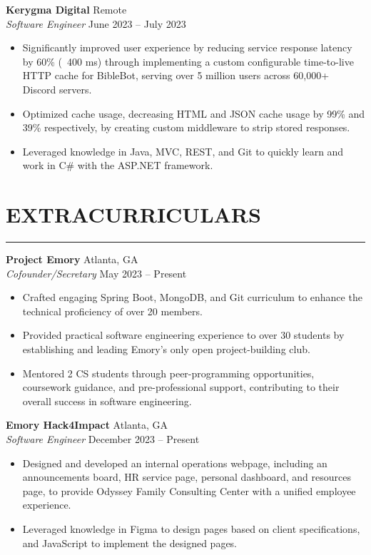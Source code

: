 \documentclass[10.5pt]{article}
\begin{document}
\noindent
\textbf{Kerygma Digital} \hfill {Remote}\\
\emph{Software Engineer} \hfill {June 2023} -- {July 2023}
\begin{itemize}
    \item Significantly improved user experience by reducing service response latency by 60\% (~400 ms) through implementing a custom configurable time-to-live HTTP cache for BibleBot, serving over 5 million users across 60,000+ Discord servers. \item Optimized cache usage, decreasing HTML and JSON cache usage by 99\% and 39\% respectively, by creating custom middleware to strip stored responses. \item Leveraged knowledge in Java, MVC, REST, and Git to quickly learn and work in C\# with the ASP.NET framework.
\end{itemize}

 \vspace{-\baselineskip}\section*{\large\textbf{EXTRACURRICULARS}}
\vspace{-\baselineskip}
\noindent\rule{\textwidth}{0.4pt}


\noindent
\textbf{Project Emory} \hfill {Atlanta, GA} \\
\emph{Cofounder/Secretary} \hfill {May 2023} -- {Present}
\begin{itemize}
    \item Crafted engaging Spring Boot, MongoDB, and Git curriculum to enhance the technical proficiency of over 20 members. \item Provided practical software engineering experience to over 30 students by establishing and leading Emory's only open project-building club. \item Mentored 2 CS students through peer-programming opportunities, coursework guidance, and pre-professional support, contributing to their overall success in software engineering.
\end{itemize}

\noindent
\textbf{Emory Hack4Impact} \hfill {Atlanta, GA} \\
\emph{Software Engineer} \hfill {December 2023} -- {Present}
\begin{itemize}
    \item Designed and developed an internal operations webpage, including an announcements board, HR service page, personal dashboard, and resources page, to provide Odyssey Family Consulting Center with a unified employee experience. \item Leveraged knowledge in Figma to design pages based on client specifications, and JavaScript to implement the designed pages.
\end{itemize}
\end{document}
